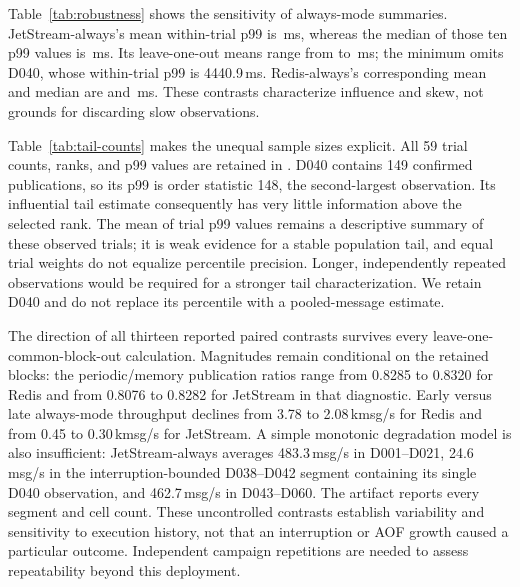 \documentclass[11pt]{article}
\theoremstyle{definition}
\newcommand{\artifact}[1]{\texttt{\path{#1}}}
\begin{document}
Table~\ref{tab:robustness} shows the sensitivity of always-mode summaries. JetStream-always's mean within-trial p99 is \NatsAlwaysPnnMean{}\,ms, whereas the median of those ten p99 values is \NatsAlwaysPnnMedian{}\,ms. Its leave-one-out means range from \NatsAlwaysPnnLooMin{} to \NatsAlwaysPnnLooMax{}\,ms; the minimum omits D040, whose within-trial p99 is 4440.9\,ms. Redis-always's corresponding mean and median are \RedisAlwaysPnnMean{} and \RedisAlwaysPnnMedian{}\,ms. These contrasts characterize influence and skew, not grounds for discarding slow observations.

\begin{table}[htbp]
\centering\small\setlength{\tabcolsep}{4pt}

\caption{Sample information underlying completed publication trials' empirical p99 values. Ranges span the retained trials of each profile. Positions above p99 are $N-\lceil0.99N\rceil$ and do not imply independent tail observations.}
\label{tab:tail-counts}
\end{table}

Table~\ref{tab:tail-counts} makes the unequal sample sizes explicit. All 59 trial counts, ranks, and p99 values are retained in \artifact{data/derived/publication-tail-samples.csv}. D040 contains 149 confirmed publications, so its p99 is order statistic 148, the second-largest observation. Its influential tail estimate consequently has very little information above the selected rank. The mean of trial p99 values remains a descriptive summary of these observed trials; it is weak evidence for a stable population tail, and equal trial weights do not equalize percentile precision. Longer, independently repeated observations would be required for a stronger tail characterization. We retain D040 and do not replace its percentile with a pooled-message estimate.

The direction of all thirteen reported paired contrasts survives every leave-one-common-block-out calculation. Magnitudes remain conditional on the retained blocks: the periodic/memory publication ratios range from 0.8285 to 0.8320 for Redis and from 0.8076 to 0.8282 for JetStream in that diagnostic. Early versus late always-mode throughput declines from 3.78 to 2.08\,kmsg/s for Redis and from 0.45 to 0.30\,kmsg/s for JetStream. A simple monotonic degradation model is also insufficient: JetStream-always averages 483.3\,msg/s in D001--D021, 24.6\,msg/s in the interruption-bounded D038--D042 segment containing its single D040 observation, and 462.7\,msg/s in D043--D060. The artifact reports every segment and cell count. These uncontrolled contrasts establish variability and sensitivity to execution history, not that an interruption or AOF growth caused a particular outcome. Independent campaign repetitions are needed to assess repeatability beyond this deployment.
\end{document}
